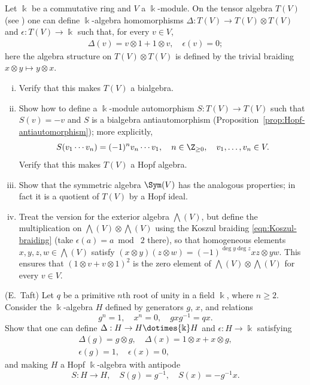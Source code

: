 	\item Let $\Bbbk$ be a commutative ring and $V$ a $\Bbbk$-module. On the
	tensor algebra $T(V)$ (see \cite[Definition 7.5.1]{Li1}) one can define
	$\Bbbk$-algebra homomorphisms
	$\Delta:T(V)\to T(V)\otimes T(V)$ and $\epsilon:T(V)\to\Bbbk$ such that,
	for every $v\in V$,
	\begin{gather*}
		\Delta(v) = v \otimes 1 + 1 \otimes v, \quad \epsilon(v) = 0;
	\end{gather*}
	here the algebra structure on $T(V)\otimes T(V)$ is defined by the trivial
	braiding $x\otimes y\mapsto y\otimes x$.
	\begin{enumerate}[(i)]
		\item Verify that this makes $T(V)$ a bialgebra.
		\item Show how to define a $\Bbbk$-module automorphism
		$S:T(V)\to T(V)$ such that $S(v)=-v$ and $S$ is a bialgebra
		antiautomorphism (Proposition~\ref{prop:Hopf-antiautomorphism}); more
		explicitly,
		\[ S(v_1 \cdots v_n) = (-1)^n v_n \cdots v_1, \quad n \in \Z_{\geq 0}, \quad v_1, \ldots, v_n \in V. \]
		Verify that this makes $T(V)$ a Hopf algebra.
		\item Show that the symmetric algebra $\Sym(V)$ has the analogous
		properties; in fact it is a quotient of $T(V)$ by a Hopf ideal.
		\item Treat the version for the exterior algebra $\bigwedge(V)$, but
		define the multiplication on $\bigwedge(V)\otimes\bigwedge(V)$ using
		the Koszul braiding \eqref{eqn:Koszul-braiding} (take
		$\epsilon(a)=a\bmod\;2$ there), so that homogeneous elements
		$x,y,z,w\in\bigwedge(V)$ satisfy
		$(x\otimes y)(z\otimes w)=(-1)^{\deg y\deg z}xz\otimes yw$. This
		ensures that $(1\otimes v+v\otimes1)^2$ is the zero element of
		$\bigwedge(V)\otimes\bigwedge(V)$ for every $v\in V$.
	\end{enumerate}

	\item (E.\ Taft) Let $q$ be a primitive $n$th root of unity in a field
	$\Bbbk$, where $n\geq2$. Consider the $\Bbbk$-algebra $H$ defined by
	generators $g$, $x$, and relations
	\[ g^n = 1, \quad x^n = 0, \quad gxg^{-1} = qx. \]
	Show that one can define $\Delta:H\to H\dotimes{\Bbbk}H$ and
	$\epsilon:H\to\Bbbk$ satisfying
	\begin{gather*}
		\Delta(g) = g \otimes g, \quad \Delta(x) = 1 \otimes x + x \otimes g, \\
		\epsilon(g) = 1, \quad \epsilon(x) = 0,
	\end{gather*}
	and making $H$ a Hopf $\Bbbk$-algebra with antipode
	\[ S:H\to H, \quad S(g)=g^{-1}, \quad S(x)=-g^{-1}x. \]

